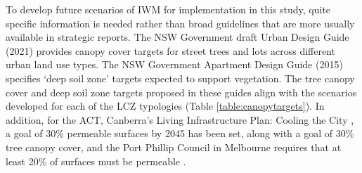 \documentclass[final,3p,times,authoryear]{elsarticle}
\begin{document}
To develop future scenarios of IWM for implementation in this study, quite specific information is needed rather than broad guidelines that are more usually available in strategic reports. The NSW Government draft Urban Design Guide (2021) \citep{NewSouthWales2021} provides canopy cover targets for street trees and lots across different urban land use types. The NSW Government Apartment Design Guide (2015) \citep{NSW2015} specifies `deep soil zone' targets expected to support vegetation. The tree canopy cover and deep soil zone targets proposed in these guides align with the scenarios developed for each of the LCZ typologies (Table \ref{table:canopytargets}). In addition, for the ACT, Canberra's Living Infrastructure Plan: Cooling the City \citep{ACTGovernment2019}, a goal of 30\% permeable surfaces by 2045 has been set, along with a goal of 30\% tree canopy cover, and the Port Phillip Council in Melbourne requires that at least 20\% of surfaces must be permeable \citep{CityofPortPhillip2018}.
\end{document}
